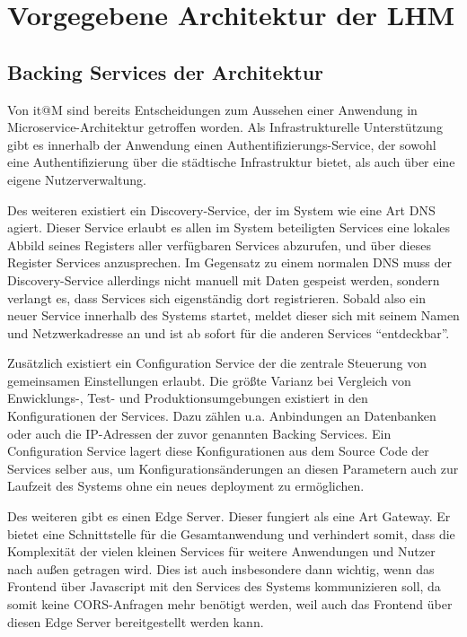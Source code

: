 \documentclass[12pt,a4paper,bibliography=totocnumbered,listof=totocnumbered]{scrartcl}
\begin{document}
\section{Vorgegebene Architektur der \acf{LHM}}\label{ch:arch-itm}

\subsection{Backing Services der Architektur}

Von it@M sind bereits Entscheidungen zum Aussehen einer Anwendung in Microservice-Architektur getroffen worden. Als Infrastrukturelle Unterstützung gibt es innerhalb der Anwendung einen Authentifizierungs-Service, der sowohl eine Authentifizierung über die städtische Infrastruktur bietet, als auch über eine eigene Nutzerverwaltung.

Des weiteren existiert ein Discovery-Service, der im System wie eine Art \acs{DNS} agiert. Dieser Service erlaubt es allen im System beteiligten Services eine lokales Abbild seines Registers aller verfügbaren Services abzurufen, und über dieses Register Services anzusprechen. Im Gegensatz zu einem normalen \ac{DNS} muss der Discovery-Service allerdings nicht manuell mit Daten gespeist werden, sondern verlangt es, dass Services sich eigenständig dort registrieren. Sobald also ein neuer Service innerhalb des Systems startet, meldet dieser sich mit seinem Namen und Netzwerkadresse an und ist ab sofort für die anderen Services \enquote{entdeckbar}.

Zusätzlich existiert ein Configuration Service der die zentrale Steuerung von gemeinsamen Einstellungen erlaubt. Die größte Varianz bei Vergleich von Enwicklungs-, Test- und Produktionsumgebungen existiert in den Konfigurationen der Services. Dazu zählen u.a. Anbindungen an Datenbanken oder auch die IP-Adressen der zuvor genannten Backing Services. Ein Configuration Service lagert diese Konfigurationen aus dem Source Code der Services selber aus, um Konfigurationsänderungen an diesen Parametern auch zur Laufzeit des Systems ohne ein neues deployment zu ermöglichen.

Des weiteren gibt es einen Edge Server. Dieser fungiert als eine Art Gateway. Er bietet eine Schnittstelle für die Gesamtanwendung und verhindert somit, dass die Komplexität der vielen kleinen Services für weitere Anwendungen und Nutzer nach außen getragen wird. Dies ist auch insbesondere dann wichtig, wenn das Frontend über Javascript mit den Services des Systems kommunizieren soll, da somit keine \acs{CORS}-Anfragen mehr benötigt werden, weil auch das Frontend über diesen Edge Server bereitgestellt werden kann.
\end{document}
